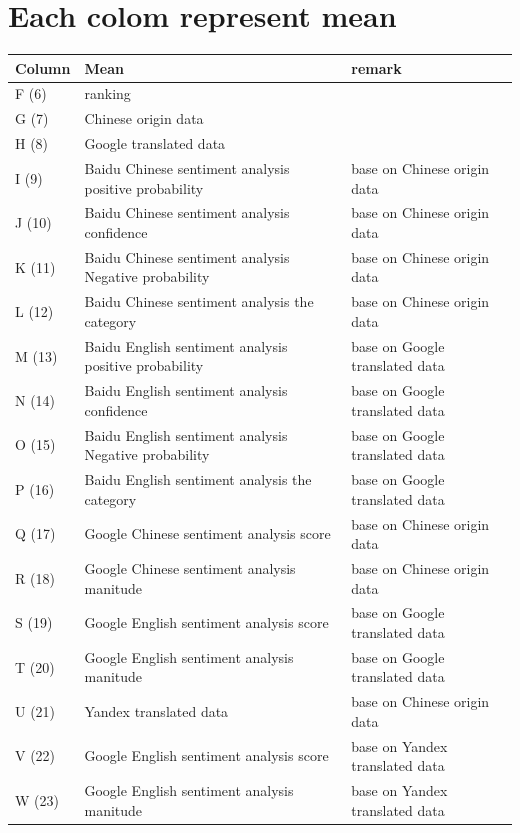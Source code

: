 

\tableofcontents

\section{Each colom represent mean}
\label{sec:org0470bc1}
\begin{center}
\begin{tabular}{lll}
Column & Mean & remark\\
\hline
F (6) & ranking & \\
G (7) & Chinese origin data & \\
H (8) & Google translated data & \\
I (9) & Baidu Chinese sentiment analysis positive probability & base on Chinese origin data\\
J (10) & Baidu Chinese sentiment analysis confidence & base on Chinese origin data\\
K (11) & Baidu Chinese sentiment analysis Negative probability & base on Chinese origin data\\
L (12) & Baidu Chinese sentiment analysis the category & base on Chinese origin data\\
M (13) & Baidu English sentiment analysis positive probability & base on Google translated data\\
N (14) & Baidu English sentiment analysis confidence & base on Google translated data\\
O (15) & Baidu English sentiment analysis Negative probability & base on Google translated data\\
P (16) & Baidu English sentiment analysis the category & base on Google translated data\\
Q (17) & Google Chinese sentiment analysis score & base on Chinese origin data\\
R (18) & Google Chinese sentiment analysis manitude & base on Chinese origin data\\
S (19) & Google English sentiment analysis score & base on Google translated data\\
T (20) & Google English sentiment analysis manitude & base on Google translated data\\
U (21) & Yandex translated data & base on Chinese origin data\\
V (22) & Google English sentiment analysis score & base on Yandex translated data\\
W (23) & Google English sentiment analysis manitude & base on Yandex translated data\\

\end{tabular}
\end{center}
